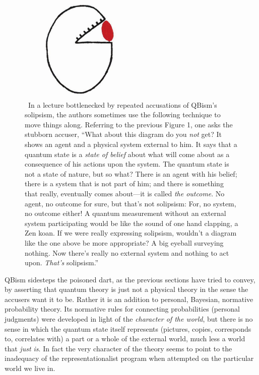 \documentclass[aps,pra,superscriptaddress,12pt,tightenlines,nofootinbib]{revtex4-2}
\begin{document}
\begin{figure}
\begin{center}
\includegraphics[height=2.0in]{sarcasm3}
\bigskip\caption{~In a lecture bottlenecked by repeated accusations of QBism's solipsism, the authors sometimes use the following technique to move things along. Referring to the previous Figure 1, one asks the stubborn accuser, ``What about this diagram do you {\it not\/} get?  It shows an agent and a physical system external to him.  It says that a quantum state is a {\it state of belief\/} about what will come about as a consequence of his actions upon the system.   The quantum state is not a state of nature, but so what?  There is an agent with his belief; there is a system that is not part of him; and there is something that really, eventually comes about---it is called {\it the outcome}.  No agent, no outcome for sure, but that's not solipsism:  For, no system, no outcome either!  A quantum measurement without an external system participating would be like the sound of one hand clapping, a Zen koan.  If we were really expressing solipsism, wouldn't a diagram like the one above be more appropriate?  A big eyeball surveying nothing.  Now there's really no external system and nothing to act upon. {\it That's\/} solipsism.''}
\label{AllForNorsen}
\end{center}
\end{figure}

QBism sidesteps the poisoned dart, as the previous sections have tried to convey, by asserting that quantum theory is just not a physical theory in the sense the accusers want it to be.  Rather it is an addition to personal, Bayesian, normative probability theory.  Its normative rules for connecting probabilities (personal judgments) were developed in light of the {\it character of the world}, but there is no sense in which the quantum state itself represents (pictures, copies, corresponds to, correlates with) a part or a whole of the external world, much less a world that {\it just is}.  In fact the very character of the theory seems to point to the inadequacy of the representationalist program when attempted on the particular world we live in.
\end{document}
